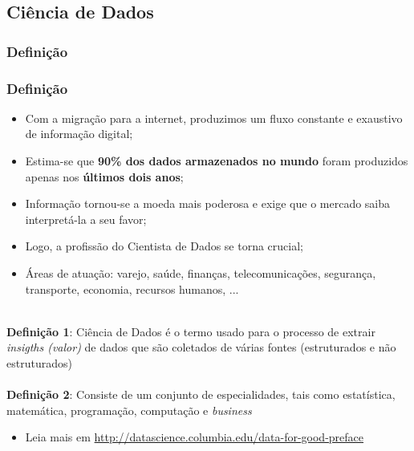\documentclass[pdf,9pt,xcolor=dvipsnames,hide notes]{beamer}\usepackage[]{graphicx}\usepackage[]{color}
\begin{document}
\subsection{Ciência de Dados}
\subsubsection{Definição}
\begin{frame}\frametitle{Definição} 
  \begin{itemize}
    \item Com a migração para a internet, produzimos um fluxo constante e exaustivo de informação digital;
    \item Estima-se que \textbf{90\% dos dados armazenados no mundo} foram produzidos apenas nos \textbf{últimos dois anos};
    \item Informação tornou-se a moeda mais poderosa e exige que o mercado saiba interpretá-la a seu favor;
    \item Logo, a profissão do Cientista de Dados se torna crucial;
    \item Áreas de atuação: varejo, saúde, finanças, telecomunicações, segurança, transporte, economia, recursos humanos, ...\\~\\
  \end{itemize}
\textbf{Definição 1}: Ciência de Dados é o termo usado para o processo de extrair \emph{insigths (valor)} de dados que são coletados de várias fontes (estruturados e não estruturados) \\~\\
\textbf{Definição 2}: Consiste de um conjunto de especialidades, tais como estatística, matemática, programação, computação e \emph{business}
\begin{itemize}
\item Leia mais em \url{http://datascience.columbia.edu/data-for-good-preface}
\end{itemize}

\end{frame}
\end{document}
